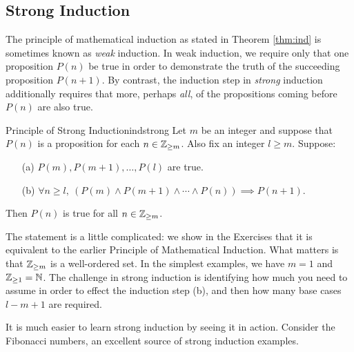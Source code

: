

\clearpage


\subsection{Strong Induction}\label{sec:strongind}

The principle of mathematical induction as stated in Theorem \ref{thm:ind} is sometimes known as \emph{weak} induction. In weak induction, we require only that one proposition $P(n)$ be true in order to demonstrate the truth of the succeeding proposition $P(n+1)$. By contrast, the induction step in \emph{strong} induction additionally requires that more, perhaps \emph{all}, of the propositions coming before $P(n)$ are also true.

\begin{thm}{Principle of Strong Induction}{indstrong}
	Let $m$ be an integer and suppose that $P(n)$ is a proposition for each $n\in\mathbb{Z}_{\ge m}$. Also fix an integer $l\ge m$. Suppose:
	\begin{enumerate}
	  \item[(a)] $P(m),P(m+1),\ldots,P(l)$ are true.
	  \item[(b)] $\forall n\ge l,\ (P(m)\wedge P(m+1)\wedge\cdots\wedge P(n))\implies P(n+1)$.
	\end{enumerate}
	Then $P(n)$ is true for all $n\in\mathbb{Z}_{\ge m}$.
\end{thm}

The statement is a little complicated: we show in the Exercises that it is equivalent to the earlier Principle of Mathematical Induction. What matters is that $\mathbb{Z}_{\ge m}$ is a well-ordered set. In the simplest examples, we have $m=1$ and $\mathbb{Z}_{\ge 1}=\mathbb{N}$. The challenge in strong induction is identifying how much you need to assume in order to effect the induction step (b), and then how many base cases $l-m+1$ are required.\par
It is much easier to learn strong induction by seeing it in action. Consider the Fibonacci numbers, an excellent source of strong induction examples.

